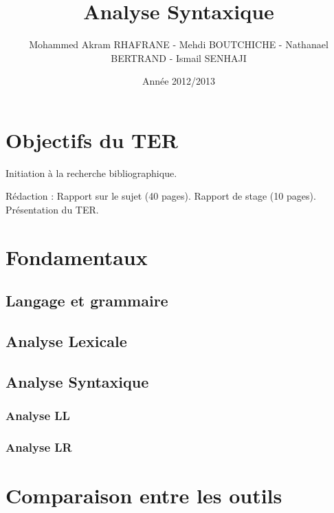\documentclass{beamer}
\title[Analyse Syntaxique]{Analyse Syntaxique}
\author{Mohammed Akram RHAFRANE - Mehdi BOUTCHICHE - Nathanael BERTRAND - Ismail SENHAJI}
\institute{Université de Toulouse III/IRIT}
\date{Année 2012/2013}
\begin{document}
\begin{frame}
  \titlepage
\end{frame}


\section{Objectifs du TER}\label{sec:Objectifs}

Initiation à la recherche bibliographique.

Rédaction :
\idem Rapport sur le sujet (40 pages).
\idem Rapport de stage (10 pages).
\idem Présentation du TER.



\frame

\section{Fondamentaux}

\subsection{Langage et grammaire}



\subsection{Analyse Lexicale}



\subsection{Analyse Syntaxique}



\subsubsection{Analyse LL}



\subsubsection{Analyse LR}



\section{Comparaison entre les outils}
\end{document}
